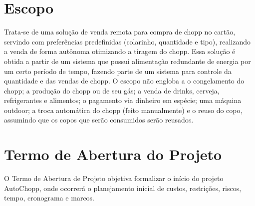 	\section[Escopo]{Escopo}
		Trata-se de uma solução de venda remota para compra de chopp no cartão, servindo com preferências predefinidas 
		(colarinho, quantidade e tipo), realizando a venda de forma autônoma otimizando a tiragem do chopp. Essa 
		solução é obtida a partir de um sistema que possui alimentação redundante de energia por um certo período de 
		tempo, fazendo parte de um sistema para controle da quantidade e das vendas de chopp. O escopo não engloba a o 
		congelamento do chopp; a produção do chopp ou de seu gás; a venda de drinks, cerveja, refrigerantes e 
		alimentos; o pagamento via dinheiro em espécie; uma máquina outdoor; a troca automática do chopp (feito 
		manualmente) e o reuso do copo, assumindo que os copos que serão consumidos serão reusados.

	\section[Termo de Abertura do Projeto]{Termo de Abertura do Projeto}
		O Termo de Abertura de Projeto objetiva formalizar o início do projeto AutoChopp, onde ocorrerá o planejamento 
		inicial de custos, restrições, riscos, tempo, cronograma e marcos. 

